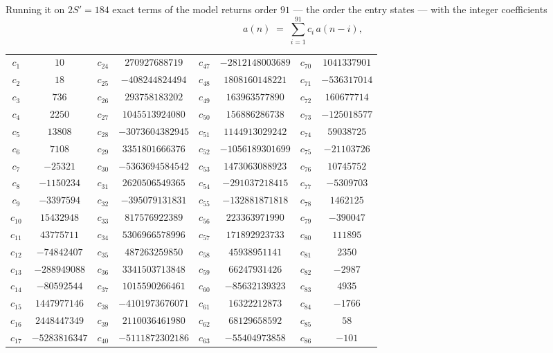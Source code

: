 \documentclass[11pt,a4paper]{article}
\theoremstyle{plain}
\theoremstyle{definition}
\begin{document}
Running it on $2S'=184$ exact terms of the model returns order $91$ --- the order the
entry states --- with the integer coefficients
\[
a(n)\;=\;\sum_{i=1}^{91}c_i\,a(n-i),
\]
\begin{center}\small
\begin{tabular}{cccccccc}
$c_{1}$ & $10$ & $c_{24}$ & $270927688719$ & $c_{47}$ & $-2812148003689$ & $c_{70}$ & $1041337901$ \\
$c_{2}$ & $18$ & $c_{25}$ & $-408244824494$ & $c_{48}$ & $1808160148221$ & $c_{71}$ & $-536317014$ \\
$c_{3}$ & $736$ & $c_{26}$ & $293758183202$ & $c_{49}$ & $163963577890$ & $c_{72}$ & $160677714$ \\
$c_{4}$ & $2250$ & $c_{27}$ & $1045513924080$ & $c_{50}$ & $156886286738$ & $c_{73}$ & $-125018577$ \\
$c_{5}$ & $13808$ & $c_{28}$ & $-3073604382945$ & $c_{51}$ & $1144913029242$ & $c_{74}$ & $59038725$ \\
$c_{6}$ & $7108$ & $c_{29}$ & $3351801666376$ & $c_{52}$ & $-1056189301699$ & $c_{75}$ & $-21103726$ \\
$c_{7}$ & $-25321$ & $c_{30}$ & $-5363694584542$ & $c_{53}$ & $1473063088923$ & $c_{76}$ & $10745752$ \\
$c_{8}$ & $-1150234$ & $c_{31}$ & $2620506549365$ & $c_{54}$ & $-291037218415$ & $c_{77}$ & $-5309703$ \\
$c_{9}$ & $-3397594$ & $c_{32}$ & $-395079131831$ & $c_{55}$ & $-132881871818$ & $c_{78}$ & $1462125$ \\
$c_{10}$ & $15432948$ & $c_{33}$ & $817576922389$ & $c_{56}$ & $223363971990$ & $c_{79}$ & $-390047$ \\
$c_{11}$ & $43775711$ & $c_{34}$ & $5306966578996$ & $c_{57}$ & $171892923733$ & $c_{80}$ & $111895$ \\
$c_{12}$ & $-74842407$ & $c_{35}$ & $487263259850$ & $c_{58}$ & $45938951141$ & $c_{81}$ & $2350$ \\
$c_{13}$ & $-288949088$ & $c_{36}$ & $3341503713848$ & $c_{59}$ & $66247931426$ & $c_{82}$ & $-2987$ \\
$c_{14}$ & $-80592544$ & $c_{37}$ & $1015590266461$ & $c_{60}$ & $-85632139323$ & $c_{83}$ & $4935$ \\
$c_{15}$ & $1447977146$ & $c_{38}$ & $-4101973676071$ & $c_{61}$ & $16322212873$ & $c_{84}$ & $-1766$ \\
$c_{16}$ & $2448447349$ & $c_{39}$ & $2110036461980$ & $c_{62}$ & $68129658592$ & $c_{85}$ & $58$ \\
$c_{17}$ & $-5283816347$ & $c_{40}$ & $-5111872302186$ & $c_{63}$ & $-55404973858$ & $c_{86}$ & $-101$ \\

\end{tabular}
\end{center}
\end{document}
